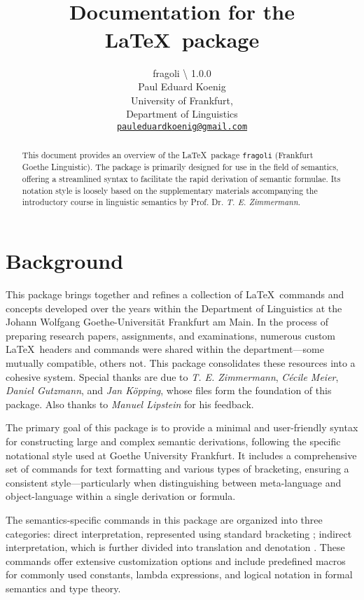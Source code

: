 \documentclass[10pt, a4paper]{article}
\title{\FraGoLi\\Documentation for the \LaTeX\ package \texttt{\her{fragoli}}}
\author{fragoli \textbackslash\text{v} 1.0.0\\Paul Eduard Koenig\\University of Frankfurt,\\Department of Linguistics\\\texttt{\href{mailto:pauleduardkoenig@gmail.com}{pauleduardkoenig@gmail.com}}}
\begin{document}
	\maketitle
	\begin{abstract}
		This document provides an overview of the \LaTeX\ package \texttt{fragoli} (Frankfurt Goethe Linguistic). The package is primarily designed for use in the field of semantics, offering a streamlined syntax to facilitate the rapid derivation of semantic formulae. Its notation style is loosely based on the supplementary materials accompanying the introductory course in linguistic semantics by Prof. Dr. \textit{T. E. Zimmermann}.
	\end{abstract}
	\tableofcontents
	\section{Background}
	This package brings together and refines a collection of \LaTeX\ commands and concepts developed over the years within the Department of Linguistics at the Johann Wolfgang Goethe-Universit\"{a}t Frankfurt am Main. In the process of preparing research papers, assignments, and examinations, numerous custom \LaTeX\ headers and commands were shared within the department—some mutually compatible, others not. This package consolidates these resources into a cohesive system. Special thanks are due to \textit{T. E. Zimmermann}, \textit{Cécile Meier}, \textit{Daniel Gutzmann}, and \textit{Jan Köpping}, whose files form the foundation of this package. Also thanks to \textit{Manuel Lipstein} for his feedback. 
	
	The primary goal of this package is to provide a minimal and user-friendly syntax for constructing large and complex semantic derivations, following the specific notational style used at Goethe University Frankfurt. It includes a comprehensive set of commands for text formatting and various types of bracketing, ensuring a consistent style—particularly when distinguishing between meta-language and object-language within a single derivation or formula.
	
	The semantics-specific commands in this package are organized into three categories: direct interpretation, represented using standard bracketing ; indirect interpretation, which is further divided into translation  and denotation . These commands offer extensive customization options and include predefined macros for commonly used constants, lambda expressions, and logical notation in formal semantics and type theory.
	
\end{document}

